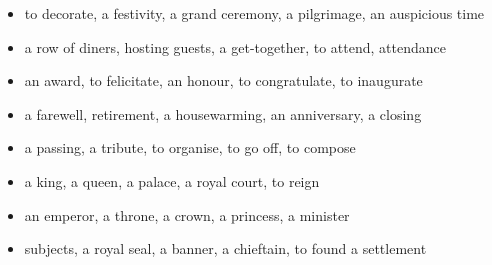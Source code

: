 \begin{itemize}
\raggedright
  \item to decorate, a festivity, a grand ceremony, a pilgrimage, an auspicious time
  \item a row of diners, hosting guests, a get-together, to attend, attendance
  \item an award, to felicitate, an honour, to congratulate, to inaugurate
  \item a farewell, retirement, a housewarming, an anniversary, a closing
  \item a passing, a tribute, to organise, to go off, to compose
  \item a king, a queen, a palace, a royal court, to reign
  \item an emperor, a throne, a crown, a princess, a minister
  \item subjects, a royal seal, a banner, a chieftain, to found a settlement
\end{itemize}

